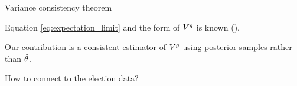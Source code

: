 \begin{frame}[t]{Variance consistency theorem}

\pause
Equation \ref{eq:expectation_limit} and the form of  $V^g$ is known (\citep{kleijn:2012:bvm}).  

Our contribution is a consistent estimator of $V^g$ using posterior samples 
rather than $\hat\theta$.

\end{frame}



\begin{frame}[c]{How to connect to the election data?}

\begin{minipage}{0.48\textwidth}
    \ElectionData{}
\end{minipage}
\begin{minipage}{0.48\textwidth}
    \ElectionResultsGlobal{}
\end{minipage}


\end{frame}
